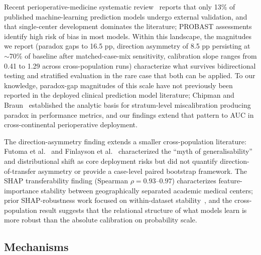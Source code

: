 Recent perioperative-medicine systematic review~\cite{arina2024probast} reports that only 13\% of published machine-learning prediction models undergo external validation, and that single-center development dominates the literature; PROBAST assessments identify high risk of bias in most models. Within this landscape, the magnitudes we report (paradox gaps to 16.5 pp, direction asymmetry of 8.5 pp persisting at $\sim$70\% of baseline after matched-case-mix sensitivity, calibration slope ranges from 0.41 to 1.29 across cross-population runs) characterize what survives bidirectional testing and stratified evaluation in the rare case that both can be applied. To our knowledge, paradox-gap magnitudes of this scale have not previously been reported in the deployed clinical prediction model literature; Chipman and Braun~\cite{chipman2017simpson} established the analytic basis for stratum-level miscalibration producing paradox in performance metrics, and our findings extend that pattern to AUC in cross-continental perioperative deployment.

The direction-asymmetry finding extends a smaller cross-population literature: Futoma et al.~\cite{Futoma2020} and Finlayson et al.~\cite{Finlayson2021} characterized the ``myth of generalisability'' and distributional shift as core deployment risks but did not quantify direction-of-transfer asymmetry or provide a case-level paired bootstrap framework. The SHAP transferability finding (Spearman $\rho = 0.93$--$0.97$) characterizes feature-importance stability between geographically separated academic medical centers; prior SHAP-robustness work focused on within-dataset stability~\cite{Lundberg2017}, and the cross-population result suggests that the relational structure of what models learn is more robust than the absolute calibration on probability scale.

\subsection{Mechanisms}
\label{discussion:mechanisms}

